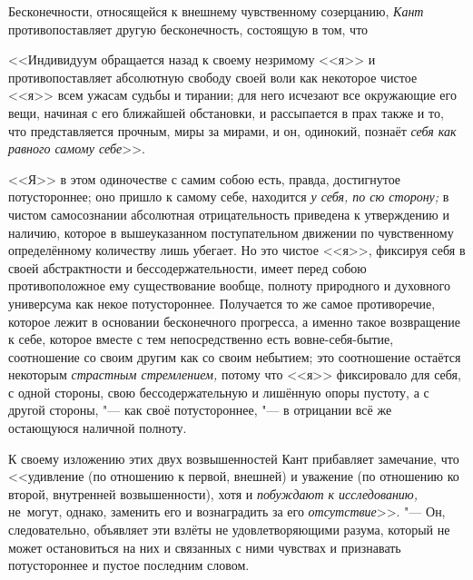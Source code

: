 Бесконечности, относящейся к внешнему чувственному созерцанию, {\em Кант}
противопоставляет другую бесконечность, состоящую в том, что

<<Индивидуум обращается назад к своему незримому <<я>> и противопоставляет
абсолютную свободу своей воли как некоторое чистое <<я>> всем ужасам судьбы
и тирании; для него исчезают все окружающие его вещи, начиная с его ближайшей
обстановки, и рассыпается в прах также и то, что представляется прочным, миры
за мирами, и он, одинокий, познаёт {\em себя как равного самому себе}>>.

<<Я>> в этом одиночестве с самим собою есть, правда, достигнутое потустороннее;
оно пришло к самому себе, находится {\em у себя, по сю сторону;} в чистом
самосознании абсолютная отрицательность приведена к утверждению и наличию,
которое в вышеуказанном поступательном движении по чувственному определённому
количеству лишь убегает. Но это чистое <<я>>, фиксируя себя в своей
абстрактности и бессодержательности, имеет перед собою противоположное ему
существование вообще, полноту природного и духовного универсума как некое
потустороннее. Получается то же самое противоречие, которое лежит в основании
бесконечного прогресса, а именно такое возвращение к себе, которое вместе с тем
непосредственно есть вовне-себя-бытие, соотношение со своим другим как со своим
небытием; это соотношение остаётся некоторым {\em страстным стремлением,}
потому что <<я>> фиксировало для себя, с одной стороны, свою бессодержательную
и лишённую опоры пустоту, а с другой стороны, "--- как своё потустороннее, "---
в отрицании всё же остающуюся наличной полноту.

К своему изложению этих двух возвышенностей Кант прибавляет замечание, что
<<удивление (по отношению к первой, внешней) и уважение (по отношению ко
второй, внутренней возвышенности), хотя и {\em побуждают к исследованию,}
не~могут, однако, заменить его и вознаградить за его
{\em отсутствие}>>. "--- Он, следовательно, объявляет эти взлёты не удовлетворяющими
разума, который не может остановиться на них и связанных с ними чувствах и
признавать потустороннее и пустое последним словом.

